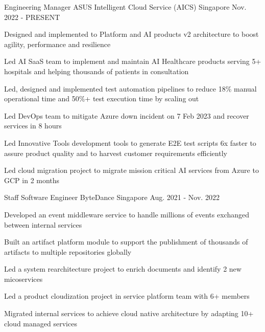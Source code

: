 

\begin{cventries}

  \cventry
    {Engineering Manager} %
    {ASUS Intelligent Cloud Service (AICS)} %
    {Singapore} %
    {Nov. 2022 - PRESENT} %
    {
      \begin{cvitems} %
        \item {Designed and implemented to Platform and AI products v2 architecture to boost agility, performance and resilience}
	\item {Led AI SaaS team to implement and maintain AI Healthcare products serving 5+ hospitals and helping thousands of patients in consultation}
        \item {Led, designed and implemented test automation pipelines to reduce 18\% manual operational time and 50\%+ test execution time by scaling out}
        \item {Led DevOps team to mitigate Azure down incident on 7 Feb 2023 and recover services in 8 hours}
        \item {Led Innovative Tools development tools to generate E2E test scripts 6x faster to assure product quality and to harvest customer requirements efficiently}
				\item {Led cloud migration project to migrate mission critical AI services from Azure to GCP in 2 months}
      \end{cvitems}
    }

  \cventry
    {Staff Software Engineer} %
    {ByteDance} %
    {Singapore} %
    {Aug. 2021 - Nov. 2022} %
    {
      \begin{cvitems} %
        \item {Developed an event middleware service to handle millions of events exchanged between internal services}
        \item {Built an artifact platform module to support the publishment of thousands of artifacts to multiple repositories globally}
        \item {Led a system rearchitecture project to enrich documents and identify 2 new micoservices}
        \item {Led a product cloudization project in service platform team with 6+ members}
				\item {Migrated internal services to achieve cloud native architecture by adapting 10+ cloud managed services}
      \end{cvitems}
    }


\end{cventries}

